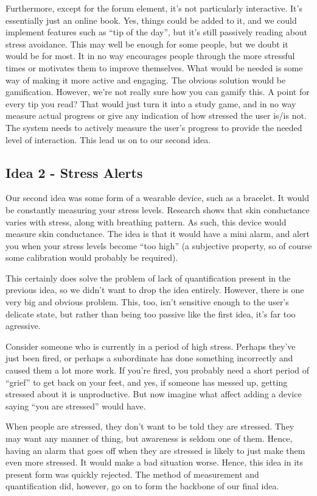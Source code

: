 \documentclass{scrartcl}
\begin{document}
Furthermore, except for the
forum element, it's not particularly interactive. It's essentially just an online book. Yes, things could be added to it, and we
could implement features such as ``tip of the day'', but it's still passively reading about stress avoidance. This may well be
enough for some people, but we doubt it would be for most. It in no way encourages people through the more stressful times or
motivates them to improve themselves. What would be needed is some way of making it more active and engaging. The obvious
solution would be gamification. However, we're not really sure how you can gamify this. A point for every tip you read?
That would just turn it into a study game, and in no way measure actual progress or give any indication of how stressed the user
is/is not. The system needs to actively measure the user's progress to provide the needed level of interaction. This lead
us on to our second idea.

\subsection{Idea 2 - Stress Alerts}
Our second idea was some form of a wearable device, such as a bracelet. It would be constantly measuring your stress levels.
Research shows that skin conductance varies with stress, along with breathing pattern. As such, this device would measure
skin conductance. The idea is that it would have a mini alarm, and alert you when your stress levels become ``too high''
(a subjective property, so of course some calibration would probably be required).

This certainly does solve the problem of lack of quantification present in the previous idea, so we didn't want to drop
the idea entirely. However, there is one very big and obvious problem. This, too, isn't sensitive enough to the user's
delicate state, but rather than being too passive like the first idea, it's far too agressive.

Consider someone who is currently in a period of high stress. Perhaps they've just been fired, or perhaps a subordinate has
done something incorrectly and caused them a lot more work. If you're fired, you probably need a short period of ``grief''
to get back on your feet, and yes, if someone has messed up, getting stressed about it is unproductive. But now imagine what
affect adding a device saying ``you are stressed'' would have.

When people are stressed, they don't want to be told they are stressed. They may want any manner of thing, but awareness
is seldom one of them. Hence, having an alarm that goes off when they are stressed is likely to just make them even more
stressed. It would make a bad situation worse. Hence, this idea in its present form was quickly rejected. The method of
measurement and quantification did, however, go on to form the backbone of our final idea.
\end{document}
